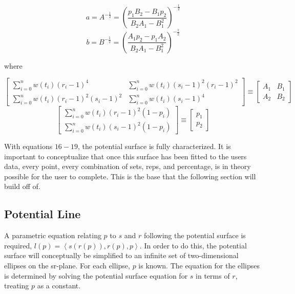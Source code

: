\begin{equation}
    a=A^{-\frac{1}{2}}
    =\left(
        \frac{p_1 B_2-B_1 p_2}{B_2 A_1-B_1^2}
    \right)^{-\frac{1}{2}}
\end{equation}
\begin{equation}
    b=B^{-\frac{1}{2}}
    =\left(
        \frac{A_1 p_2- p_1 A_2 }{B_2 A_1 -B_1^2}
    \right)^{-\frac{1}{2}}
\end{equation}
\centerline{where}
\begin{equation*}
    \begin{bmatrix}
        \sum_{i=0}^{n}w(t_i)(r_i-1)^4 & \sum_{i=0}^{n}w(t_i)(s_i-1)^2(r_i-1)^2\\
        \sum_{i=0}^{n}w(t_i)(r_i-1)^2(s_i-1)^2 & \sum_{i=0}^{n}w(t_i)(s_i-1)^4
    \end{bmatrix}
    \equiv
    \begin{bmatrix}
        A_1 & B_1\\
        A_2 & B_2
    \end{bmatrix}
\end{equation*}
\begin{equation*}
    \begin{bmatrix}
        \sum_{i=0}^{n}w(t_i)(r_i-1)^2(1-p_i) \\
        \sum_{i=0}^{n}w(t_i)(s_i-1)^2(1-p_i)
    \end{bmatrix}
    \equiv
    \begin{bmatrix}
        p_1 \\
        p_2
    \end{bmatrix}
\end{equation*}

With equations $16-19$, the potential surface is fully characterized. It is important to conceptualize that once this surface has been fitted to the users data, every point, every combination of sets, reps, and percentage, is in theory possible for the user to complete. This is the base that the following section will build off of.


\subsection{Potential Line}
A parametric equation relating $p$ to $s$ and $r$ following the potential surface is required, $l(p)=\left<s(r(p)),r(p),p\right>$.
In order to do this, the potential surface will conceptually be simplified to an infinite set of two-dimensional ellipses on the sr-plane. For each ellipse, $p$ is known. The equation for the ellipses is determined by solving the potential surface equation for $s$ in terms of $r$, treating $p$ as a constant.

